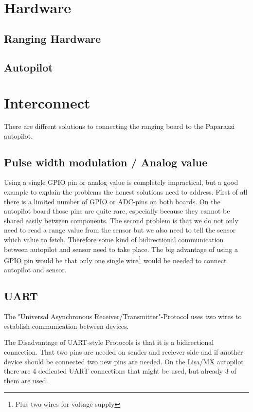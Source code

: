 \section{Hardware}

\subsection{Ranging Hardware}

\subsection{Autopilot}

\section{Interconnect}
There are diffrent solutions to connecting the ranging board to the Paparazzi autopilot.

\subsection{Pulse width modulation / Analog value}
Using a single GPIO pin or analog value is completely impractical, but a good example to explain the problems the honest solutions need to address.
First of all there is a limited number of GPIO or ADC-pins on both boards.
On the autopilot board those pins are quite rare, especially because they cannot be shared easily between components.
The second problem is that we do not only need to read a range value from the sensor but we also need to tell the sensor which value to fetch.
Therefore some kind of bidirectional communication between autopilot and sensor need to take place.
The big advantage of using a GPIO pin would be that only one single wire\footnote{Plus two wires for voltage supply} would be needed to connect autopilot and sensor.

\subsection{UART}
The "Universal Asynchronous Receiver/Transmitter"-Protocol uses two wires to establish communication between devices.
\cite{wingen_automatic_2004}

The Disadvantage of UART-style Protocols is that it is a bidirectional connection.
That two pins are needed on sender and reciever side and if another device should be connected two new pins are needed.
On the Lisa/MX autopilot there are 4 dedicated UART connections that might be used, but already 3 of them are used.

